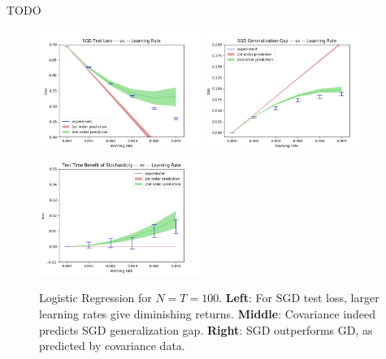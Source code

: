 \documentclass[12pt]{article}
\begin{document}
            {\color{red} TODO}

            \begin{figure}[h]
                \center
                \includegraphics[width=5.25cm]{out-sgd-logis}
                \includegraphics[width=5.25cm]{gen-sgd-logis}
                \includegraphics[width=5.25cm]{out-diff-logis}
                \caption{
                    Logistic Regression for $N=T=100$.
                    {\bf Left}: For SGD test loss, larger learning rates give diminishing returns.
                    {\bf Middle}: Covariance indeed predicts SGD generalization gap.
                    {\bf Right}: SGD outperforms GD, as predicted by covariance data.
                    }
            \end{figure}
\end{document}
